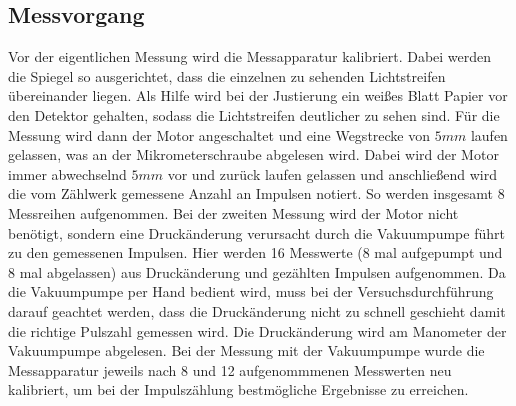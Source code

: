 \subsection{Messvorgang}
Vor der eigentlichen Messung wird die Messapparatur kalibriert. Dabei werden die Spiegel so ausgerichtet, dass die einzelnen zu sehenden Lichtstreifen übereinander liegen. Als Hilfe wird bei der Justierung ein weißes Blatt Papier vor den Detektor gehalten, sodass die Lichtstreifen deutlicher zu sehen sind. Für die Messung wird dann der Motor angeschaltet und eine Wegstrecke von $5mm$ laufen gelassen, was an der Mikrometerschraube abgelesen wird. Dabei wird der Motor immer abwechselnd $5mm$ vor und zurück laufen gelassen und anschließend wird die vom Zählwerk gemessene Anzahl an Impulsen notiert. So werden insgesamt 8 Messreihen aufgenommen. \newline
\noindent
Bei der zweiten Messung wird der Motor nicht benötigt, sondern eine Druckänderung verursacht durch die Vakuumpumpe führt zu den gemessenen Impulsen.
Hier werden 16 Messwerte (8 mal aufgepumpt und 8 mal abgelassen) aus Druckänderung und gezählten Impulsen aufgenommen. Da die Vakuumpumpe per Hand bedient wird, muss bei der Versuchsdurchführung darauf geachtet werden, dass die Druckänderung nicht zu schnell geschieht damit die richtige Pulszahl gemessen wird. Die Druckänderung wird am Manometer der Vakuumpumpe abgelesen. Bei der Messung mit der Vakuumpumpe wurde die Messapparatur jeweils nach 8 und 12 aufgenommmenen Messwerten neu kalibriert, um bei der Impulszählung bestmögliche Ergebnisse zu erreichen. 

